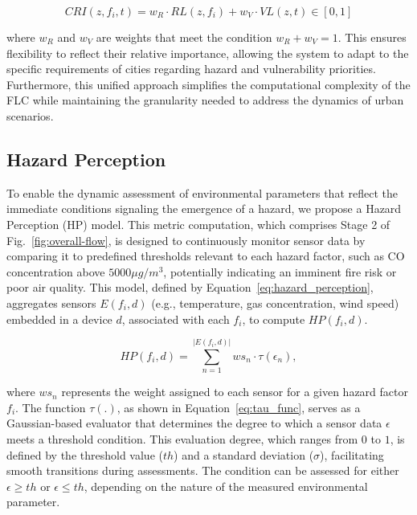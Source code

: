 \documentclass[conference]{IEEEtran}
\begin{document}
\begin{equation}
    \label{eq:cri}
    CRI(z, f_i, t) = w_{R} \cdot RL(z, f_i) + w_{V} \cdot VL(z, t) \in [0, 1]
\end{equation}

\noindent where \( w_{R} \) and \( w_{V} \) are weights that meet the condition \( w_{R} + w_{V} = 1 \). This ensures flexibility to reflect their relative importance, allowing the system to adapt to the specific requirements of cities regarding hazard and vulnerability priorities. Furthermore, this unified approach simplifies the computational complexity of the FLC while maintaining the granularity needed to address the dynamics of urban scenarios.

\subsection{Hazard Perception}

To enable the dynamic assessment of environmental parameters that reflect the immediate conditions signaling the emergence of a hazard, we propose a Hazard Perception (HP) model. This metric computation, which comprises Stage 2 of Fig.~\ref{fig:overall-flow}, is designed to continuously monitor sensor data by comparing it to predefined thresholds relevant to each hazard factor, such as \( \text{CO} \) concentration above \( 5000 \mu g/m^3 \), potentially indicating an imminent fire risk or poor air quality. This model, defined by Equation~\ref{eq:hazard_perception}, aggregates sensors \( E(f_i, d) \) (e.g., temperature, gas concentration, wind speed) embedded in a device \( d \), associated with each \( f_i \), to compute \( HP(f_i, d) \).

\begin{equation}
    \label{eq:hazard_perception}
    HP(f_i, d) = \sum_{n=1}^{|E(f_i,d)|} ws_n \cdot \tau(\epsilon_n),
\end{equation}

\noindent where \( ws_n \) represents the weight assigned to each sensor for a given hazard factor \( f_i \). The function \( \tau(.) \), as shown in Equation~\ref{eq:tau_func}, serves as a Gaussian-based evaluator that determines the degree to which a sensor data \( \epsilon \) meets a threshold condition. This evaluation degree, which ranges from \( 0 \) to \( 1 \), is defined by the threshold value (\( th \)) and a standard deviation (\( \sigma \)), facilitating smooth transitions during assessments. The condition can be assessed for either \( \epsilon \geq th \) or \( \epsilon \leq th \), depending on the nature of the measured environmental parameter.
\end{document}
